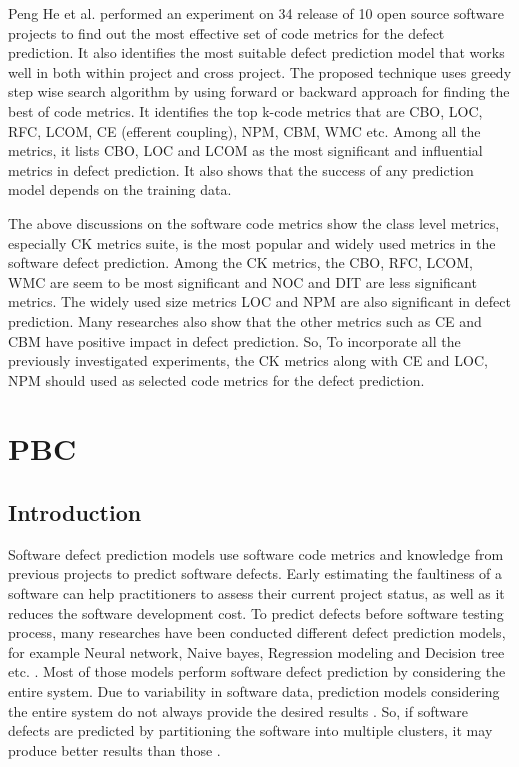 \documentclass[12pt]{report}
\begin{document}
Peng He et al. \cite{he2015empirical} performed an experiment on 34 release of 10 open source software projects to find out the most effective set of code metrics for the defect prediction. It also identifies the most suitable defect prediction model that works well in both within project and cross project. The proposed technique uses greedy step wise search algorithm by using forward or backward approach for finding the best of code metrics. It identifies the top k-code metrics that are CBO, LOC, RFC, LCOM, CE (efferent coupling), NPM, CBM, WMC etc. Among all the metrics, it lists CBO, LOC and LCOM as the most significant and influential metrics in defect prediction. It also shows that the success of any prediction model depends on the training data.

The above discussions on the software code metrics show the class level metrics, especially CK metrics suite, is the most popular and widely used metrics in the software defect prediction. Among the CK metrics, the CBO, RFC, LCOM, WMC are seem to be most significant and NOC and DIT are less significant metrics. The widely used size metrics LOC and NPM are also significant in defect prediction. Many researches also show that the other metrics such as CE and CBM have positive impact in defect prediction. So, To incorporate all the previously investigated experiments, the CK metrics along with CE and LOC, NPM should used as selected code metrics for the defect prediction.     

\chapter{PBC}

\section{Introduction}

Software defect prediction models use software code metrics and knowledge from previous projects to predict software defects. Early estimating the faultiness of a software can help practitioners to assess their current project status, as well as it reduces the software development cost. To predict defects before software testing process, many researches have been conducted different defect prediction models, for example Neural network, Naive bayes, Regression modeling and Decision tree etc. \cite{catal2009systematic}. Most of those models perform software defect prediction by considering the entire system. Due to variability in software data, prediction models considering the entire system do not always provide the desired results \cite{bettenburg2012think}. So, if software defects are predicted by partitioning the software into multiple clusters, it may produce better results than those \cite{scanniello2013class}.
\end{document}
